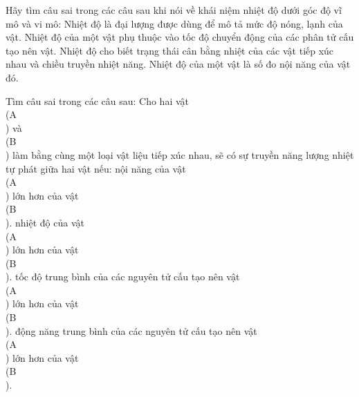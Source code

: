 \begin{ex}
Hãy tìm câu sai trong các câu sau khi nói về khái niệm nhiệt độ dưới góc độ vĩ mô và vi mô:
\choice
{Nhiệt độ là đại lượng được dùng để mô tả mức độ nóng, lạnh của vật.}
{Nhiệt độ của một vật phụ thuộc vào tốc độ chuyển động của các phân tử cấu tạo nên vật.}
{Nhiệt độ cho biết trạng thái cân bằng nhiệt của các vật tiếp xúc nhau và chiều truyền nhiệt năng.}
{\True Nhiệt độ của một vật là số đo nội năng của vật đó.}
\end{ex}

\begin{ex}
Tìm câu sai trong các câu sau: Cho hai vật \\(A\\) và \\(B\\) làm bằng cùng một loại vật liệu tiếp xúc nhau, sẽ có sự truyền năng lượng nhiệt tự phát giữa hai vật nếu:
\choice
{\True nội năng của vật \\(A\\) lớn hơn của vật \\(B\\).}
{nhiệt độ của vật \\(A\\) lớn hơn của vật \\(B\\).}
{tốc độ trung bình của các nguyên tử cấu tạo nên vật \\(A\\) lớn hơn của vật \\(B\\).}
{động năng trung bình của các nguyên tử cấu tạo nên vật \\(A\\) lớn hơn của vật \\(B\\).}
\end{ex}

